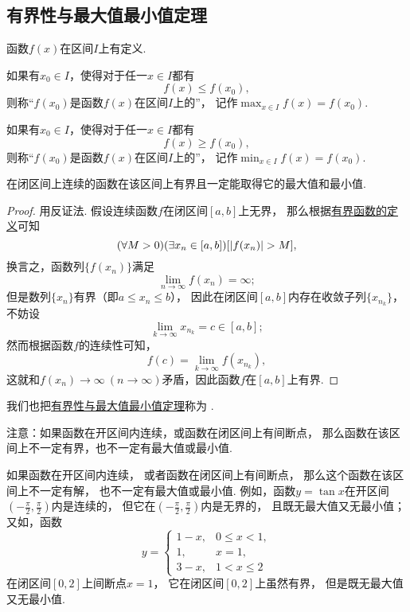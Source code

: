 \subsection{有界性与最大值最小值定理}
\begin{definition}
函数\(f(x)\)在区间\(I\)上有定义.

如果有\(x_0 \in I\)，使得对于任一\(x \in I\)都有\[
	f(x) \leq f(x_0),
\]
则称“\(f(x_0)\)是函数\(f(x)\)在区间\(I\)上的”，
记作\(\max_{x \in I}f(x) = f(x_0)\).

如果有\(x_0 \in I\)，使得对于任一\(x \in I\)都有\[
	f(x) \geq f(x_0),
\]
则称“\(f(x_0)\)是函数\(f(x)\)在区间\(I\)上的”，
记作\(\min_{x \in I}f(x) = f(x_0)\).
\end{definition}

\begin{theorem}[有界性与最大值最小值定理]\label{theorem:极限.最值定理}
在闭区间上连续的函数在该区间上有界且一定能取得它的最大值和最小值.
\begin{proof}
用反证法.
假设连续函数\(f\)在闭区间\([a,b]\)上无界，
那么根据\hyperref[definition:函数.函数的有界性]{有界函数的定义}可知\[
	(\forall M>0)
	(\exists x_n\in[a,b])
	[\abs{f(x_n)} > M],
\]
换言之，函数列\(\{f(x_n)\}\)满足\[
	\lim_{n\to\infty} f(x_n) = \infty;
\]
但是数列\(\{x_n\}\)有界（即\(a \leq x_n \leq b\)），
因此在闭区间\([a,b]\)内存在收敛子列\(\{x_{n_k}\}\)，
不妨设\[
	\lim_{k\to\infty} x_{n_k} = c \in [a,b];
\]
然而根据函数\(f\)的连续性可知，\[
	f(c) = \lim_{k\to\infty} f(x_{n_k}),
\]
这就和\(f(x_n)\to\infty\ (n\to\infty)\)矛盾，因此函数\(f\)在\([a,b]\)上有界.
\end{proof}
\end{theorem}
我们也把\hyperref[theorem:极限.最值定理]{有界性与最大值最小值定理}称为%
.

注意：如果函数在开区间内连续，或函数在闭区间上有间断点，
那么函数在该区间上不一定有界，也不一定有最大值或最小值.

如果函数在开区间内连续，
或者函数在闭区间上有间断点，
那么这个函数在该区间上不一定有解，
也不一定有最大值或最小值.
例如，函数\(y=\tan x\)在开区间\(\left(-\frac{\pi}{2},\frac{\pi}{2}\right)\)内是连续的，
但它在\(\left(-\frac{\pi}{2},\frac{\pi}{2}\right)\)内是无界的，
且既无最大值又无最小值；
又如，函数\[
	y=\left\{ \begin{array}{ll}
		1-x, & 0\leq x<1, \\
		1, & x=1, \\
		3-x, & 1<x\leq2
	\end{array} \right.
\]在闭区间\([0,2]\)上间断点\(x=1\)，
它在闭区间\([0,2]\)上虽然有界，
但是既无最大值又无最小值.

